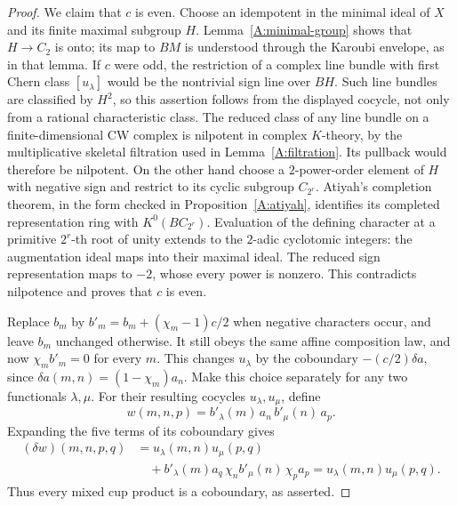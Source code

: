\begin{proof}
We claim that $c$ is even.  Choose an idempotent in the minimal ideal
of $X$ and its finite maximal subgroup $H$.  Lemma~\ref{A:minimal-group}
shows that $H\to C_2$ is onto; its map to $BM$ is understood through
the Karoubi envelope, as in that lemma.  If $c$ were odd, the restriction
of a complex line bundle with first Chern class $[u_\lambda]$ would
be the nontrivial sign line over $BH$.  Such line bundles are classified
by $H^2$, so this assertion follows from the displayed cocycle, not
only from a rational characteristic class.  The reduced class of any
line bundle on a finite-dimensional CW complex is nilpotent in complex
$K$-theory, by the multiplicative skeletal filtration used in
Lemma~\ref{A:filtration}.  Its pullback would therefore be nilpotent.
On the other hand choose a $2$-power-order element of $H$ with negative
sign and restrict to its cyclic subgroup $C_{2^r}$.  Atiyah's completion
theorem, in the form checked in Proposition~\ref{A:atiyah}, identifies
its completed representation ring with $K^0(BC_{2^r})$.
Evaluation of the defining character at a primitive $2^r$-th root
of unity extends to the $2$-adic cyclotomic integers: the augmentation
ideal maps into their maximal ideal.  The reduced sign representation
maps to $-2$, whose every power is nonzero.  This contradicts
nilpotence and proves that $c$ is even.

Replace $b_m$ by
$b'_m=b_m+(\chi_m-1)c/2$ when negative characters occur, and leave
$b_m$ unchanged otherwise.  It still obeys the same affine composition
law, and now $\chi_m b'_m=0$ for every $m$.
This changes $u_\lambda$ by the coboundary
$-(c/2)\delta a$, since
$\delta a(m,n)=(1-\chi_m)a_n$.
Make this choice separately for any two functionals $\lambda,\mu$.
For their resulting cocycles $u_\lambda,u_\mu$, define
\[
 w(m,n,p)=b'_\lambda(m)\,a_n\,b'_\mu(n)\,a_p.
\]
Expanding the five terms of its coboundary gives
\[
 \begin{split}
 (\delta w)(m,n,p,q)
 &=u_\lambda(m,n)u_\mu(p,q)\\
 &\quad+b'_\lambda(m)a_q\,
       \chi_n b'_\mu(n)\,\chi_p a_p
  =u_\lambda(m,n)u_\mu(p,q).
 \end{split}
\]
Thus every mixed cup product is a coboundary, as asserted.
\end{proof}

